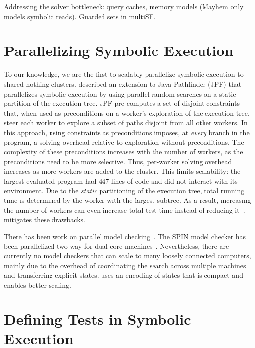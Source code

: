 Addressing the solver bottleneck: query caches, memory models (Mayhem only models symbolic reads). Guarded sets in multiSE.

\section{Parallelizing Symbolic Execution}
\label{sec:relwork:parsymbex}

To our knowledge, we are the first to scalably parallelize symbolic execution to shared-nothing clusters.
%
\cite{parallelSymbex} described an extension to Java Pathfinder (JPF) that parallelizes symbolic execution by using parallel random searches on a static partition of the execution tree.  JPF pre-computes a set of disjoint constraints that, when used as preconditions on a worker's exploration of the execution tree, steer each worker to explore a subset of paths disjoint from all other workers.  In this approach, using constraints as preconditions imposes, at {\em every} branch in the program, a solving overhead relative to exploration without preconditions.  The complexity of these preconditions increases with the number of workers, as the preconditions need to be more selective.  Thus, per-worker solving overhead increases as more workers are added to the cluster.  This limits scalability: the largest evaluated program had 447 lines of code and did not interact with its environment.  Due to the {\em static} partitioning of the execution tree, total running time is determined by the worker with the largest subtree.  As a result, increasing the number of workers can even increase total test time instead of reducing it~\cite{parallelSymbex}.  \cnine mitigates these drawbacks.

There has been work on parallel model checking~\cite{parallelMurphi,distributed-spin,loadBalModelchecking,spin:multicore-modelchecking,modelCheckBDD}.  The SPIN model checker has been parallelized two-way for dual-core machines~\cite{parallelSPIN}. Nevertheless, there are currently no model checkers that can scale to many loosely connected computers, mainly due to the overhead of coordinating the search across multiple machines and transferring explicit states. \cnine uses an encoding of states that is compact and enables better scaling.

\fi


\section{Defining Tests in Symbolic Execution}
\label{sec:relwork:symtests}

